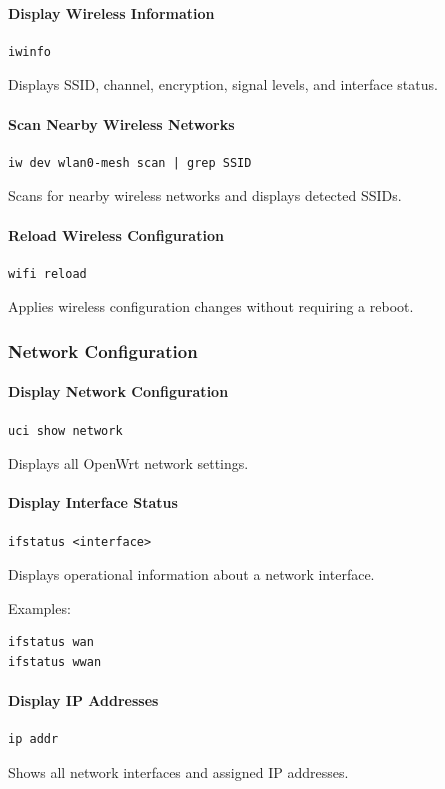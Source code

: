 \documentclass[conference]{IEEEtran}
\begin{document}
\paragraph{Display Wireless Information}
\begin{verbatim}
iwinfo
\end{verbatim}
Displays SSID, channel, encryption, signal levels, and interface status.

\paragraph{Scan Nearby Wireless Networks}
\begin{verbatim}
iw dev wlan0-mesh scan | grep SSID
\end{verbatim}
Scans for nearby wireless networks and displays detected SSIDs.

\paragraph{Reload Wireless Configuration}
\begin{verbatim}
wifi reload
\end{verbatim}
Applies wireless configuration changes without requiring a reboot.

\subsubsection{Network Configuration}

\paragraph{Display Network Configuration}
\begin{verbatim}
uci show network
\end{verbatim}
Displays all OpenWrt network settings.

\paragraph{Display Interface Status}
\begin{verbatim}
ifstatus <interface>
\end{verbatim}
Displays operational information about a network interface.

Examples:
\begin{verbatim}
ifstatus wan
ifstatus wwan
\end{verbatim}

\paragraph{Display IP Addresses}
\begin{verbatim}
ip addr
\end{verbatim}
Shows all network interfaces and assigned IP addresses.
\end{document}
